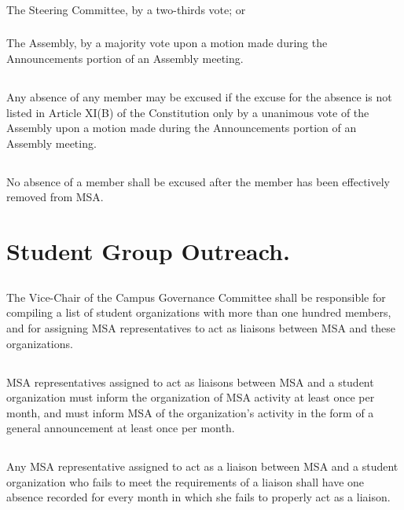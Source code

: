 \documentclass{rules}
\begin{document}
\subsubsection{}
The Steering Committee, by a two-thirds vote; or
\subsubsection{}
The Assembly, by a majority vote upon a motion made during the Announcements portion of an Assembly meeting.
\subsection{}
Any absence of any member may be excused if the excuse for the absence is not listed in Article XI(B) of the Constitution only by a unanimous vote of the Assembly upon a motion made during the Announcements portion of an Assembly meeting.
\subsection{}
No absence of a member shall be excused after the member has been effectively removed from MSA.

\section{Student Group Outreach.}
\subsection{}
The Vice-Chair of the Campus Governance Committee shall be responsible for compiling a list of student organizations with more than one hundred members, and for assigning MSA representatives to act as liaisons between MSA and these organizations.
\subsection{}
MSA representatives assigned to act as liaisons between MSA and a student organization must inform the organization of MSA activity at least once per month, and must inform MSA of the organization's activity in the form of a general announcement at least once per month.
\subsection{}
Any MSA representative assigned to act as a liaison between MSA and a student organization who fails to meet the requirements of a liaison shall have one absence recorded for every month in which she fails to properly act as a liaison.
\end{document}
